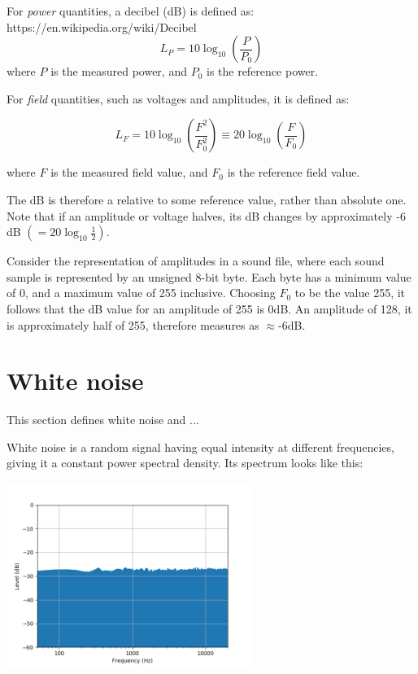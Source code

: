 \documentclass[a4paper,10pt]{article}
\begin{document}
For \emph{power} quantities, a decibel (dB) is defined as: https://en.wikipedia.org/wiki/Decibel
\begin{equation}
 L_P = 10 \log_{10}\left(\frac{P}{P_0}\right)
\end{equation}
where $P$ is the measured power, and $P_0$ is the reference power.

For \emph{field} quantities, such as voltages and amplitudes, it is defined as:

\begin{equation}
 L_F = 10 \log_{10}\left(\frac{F^2}{F^2_0}\right) \equiv 20 \log_{10}\left(\frac{F}{F_0}\right)
\end{equation}

where $F$ is the measured field value, and $F_0$ is the reference field value.

The dB is therefore a relative to some reference value, rather than absolute one. Note that if an amplitude or voltage halves, its dB changes by approximately -6 dB $( = 20 \log_{10}\frac{1}{2})$.

Consider the representation of amplitudes in a sound file, where each sound sample is represented by an unsigned 8-bit byte. Each byte has a minimum value of 0, and a maximum value of 255 inclusive. Choosing $F_0$ to be the value 255, it follows that the dB value for an amplitude of 255 is 0dB. An amplitude of 128, it is approximately half of 255, therefore measures as $\approx$-6dB.
\section{White noise}
This section defines white noise and ...

White noise is a random signal having equal intensity at different frequencies, giving it a constant power spectral density\cite{wiki_white}. Its spectrum looks like this:

\begin{center}
\includegraphics[height=6cm]{white.png}
\end{center}
\end{document}
